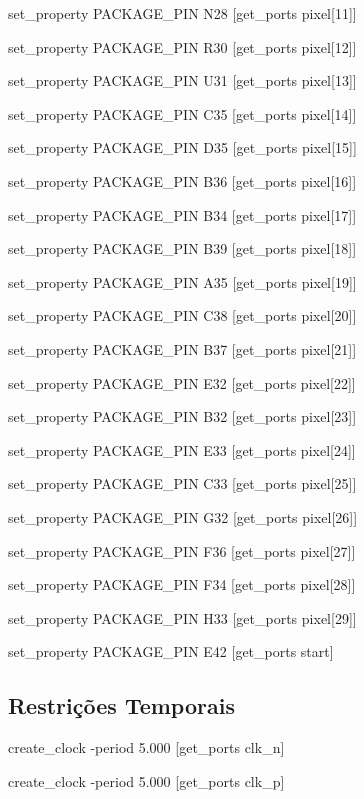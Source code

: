 set\_property PACKAGE\_PIN N28 [get\_ports {pixel[11]}]

set\_property PACKAGE\_PIN R30 [get\_ports {pixel[12]}]

set\_property PACKAGE\_PIN U31 [get\_ports {pixel[13]}]

set\_property PACKAGE\_PIN C35 [get\_ports {pixel[14]}]

set\_property PACKAGE\_PIN D35 [get\_ports {pixel[15]}]

set\_property PACKAGE\_PIN B36 [get\_ports {pixel[16]}]

set\_property PACKAGE\_PIN B34 [get\_ports {pixel[17]}]

set\_property PACKAGE\_PIN B39 [get\_ports {pixel[18]}]

set\_property PACKAGE\_PIN A35 [get\_ports {pixel[19]}]

set\_property PACKAGE\_PIN C38 [get\_ports {pixel[20]}]

set\_property PACKAGE\_PIN B37 [get\_ports {pixel[21]}]

set\_property PACKAGE\_PIN E32 [get\_ports {pixel[22]}]

set\_property PACKAGE\_PIN B32 [get\_ports {pixel[23]}]

set\_property PACKAGE\_PIN E33 [get\_ports {pixel[24]}]

set\_property PACKAGE\_PIN C33 [get\_ports {pixel[25]}]

set\_property PACKAGE\_PIN G32 [get\_ports {pixel[26]}]

set\_property PACKAGE\_PIN F36 [get\_ports {pixel[27]}]

set\_property PACKAGE\_PIN F34 [get\_ports {pixel[28]}]

set\_property PACKAGE\_PIN H33 [get\_ports {pixel[29]}]

set\_property PACKAGE\_PIN E42 [get\_ports start]

\subsection{Restrições Temporais} \label{ap2:timing_cnstrs}

create\_clock -period 5.000 [get\_ports clk\_n]

create\_clock -period 5.000 [get\_ports clk\_p]